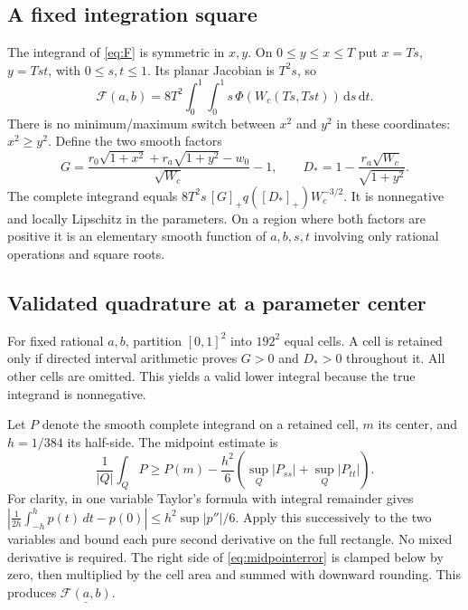 \documentclass[11pt]{article}
\numberwithin{equation}{section}
\theoremstyle{definition}\newtheorem{definition}[theorem]{Definition}
\theoremstyle{remark}\newtheorem{remark}[theorem]{Remark}
\newcommand{\dd}{\,\mathrm d}
\begin{document}
\subsection{A fixed integration square}
The integrand of \cref{eq:F} is symmetric in $x,y$. On $0\le y\le x\le T$
put $x=Ts$, $y=Tst$, with $0\le s,t\le1$. Its planar Jacobian is $T^2s$,
so
\begin{equation}\label{eq:unitintegral}
 \mathcal F(a,b)=8T^2\int_0^1\int_0^1
     s\,\Phi(W_c(Ts,Tst))\dd s\dd t.
\end{equation}
There is no minimum/maximum switch between $x^2$ and $y^2$ in these
coordinates: $x^2\ge y^2$. Define the two smooth factors
\[
 G=\frac{r_0\sqrt{1+x^2}+r_a\sqrt{1+y^2}-w_0}{\sqrt{W_c}}-1,
 \qquad D_*=1-\frac{r_a\sqrt{W_c}}{\sqrt{1+y^2}}.
\]
The complete integrand equals
$8T^2s\,[G]_+q([D_*]_+)W_c^{-3/2}$. It is nonnegative and locally
Lipschitz in the parameters. On a region where both factors are positive
it is an elementary smooth function of $a,b,s,t$ involving only rational
operations and square roots.

\subsection{Validated quadrature at a parameter center}
For fixed rational $a,b$, partition $[0,1]^2$ into $192^2$ equal cells.
A cell is retained only if directed interval arithmetic proves $G>0$ and
$D_*>0$ throughout it. All other cells are omitted. This yields a valid
lower integral because the true integrand is nonnegative.

Let $P$ denote the smooth complete integrand on a retained cell, $m$ its
center, and $h=1/384$ its half-side. The midpoint estimate is
\begin{equation}\label{eq:midpointerror}
 \frac1{|Q|}\int_Q P\ge P(m)-\frac{h^2}{6}
      \left(\sup_Q|P_{ss}|+\sup_Q|P_{tt}|\right).
\end{equation}
For clarity, in one variable Taylor's formula with integral remainder gives
$|\frac1{2h}\int_{-h}^h p(t)\,dt-p(0)|\le h^2\sup|p''|/6$.
Apply this successively to the two variables and bound each pure second
derivative on the full rectangle. No mixed derivative is required.
The right side of \cref{eq:midpointerror} is clamped below by zero, then
multiplied by the cell area and summed with downward rounding. This produces
$\underline{\mathcal F(a,b)}$.
\end{document}
